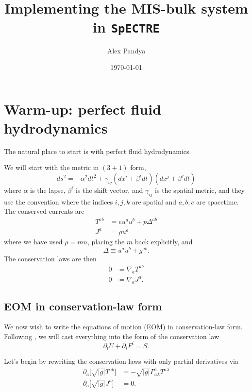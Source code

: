 \documentclass[12pt]{article}
\numberwithin{equation}{section}
\begin{document}
\title{Implementing the MIS-bulk system in {\tt SpECTRE}}
\author{Alex Pandya}
\date{\today}
\maketitle

\section{Warm-up: perfect fluid hydrodynamics}

The natural place to start is with perfect fluid hydrodynamics.

We will start with the metric in $(3+1)$ form,
\begin{equation}
ds^2 = - \alpha^2 dt^2 + \gamma_{ij} (dx^i + \beta^i dt) (dx^j + \beta^j dt)
\end{equation}
where $\alpha$ is the lapse, $\beta^{i}$ is the shift vector, and $\gamma_{ij}$
is the spatial metric, and they use the convention where the indices $i,j,k$
are spatial and $a,b,c$ are spacetime.
The conserved currents are
\begin{align}
T^{ab} &= e u^a u^b + p \Delta^{ab} \\
J^{a} &= \rho u^a
\end{align}
where we have used $\rho = m n$, placing the $m$ back explicitly, and
\begin{equation}
\Delta \equiv u^a u^b + g^{ab}.
\end{equation}
The conservation laws are then
\begin{align}
0 &= \nabla_{a} T^{ab} \\
0 &= \nabla_{a} J^{a}.
\end{align}

\subsection{EOM in conservation-law form}

We now wish to write the equations of motion (EOM) in conservation-law form.
Following \cite{BaumgarteShapiro}, we will cast everything into the form of the conservation law
\begin{equation}
\partial_t U + \partial_i F^{i} = S.
\end{equation}

Let's begin by rewriting the conservation laws with only partial derivatives via
\begin{align}
\partial_a \big[ \sqrt{|g|} T^{ab} \big] &= -\sqrt{|g|} \Gamma^{b}_{a \lambda} T^{a \lambda} \\
\partial_a \big[ \sqrt{|g|} J^{a} \big] &= 0.
\end{align}
\end{document}
